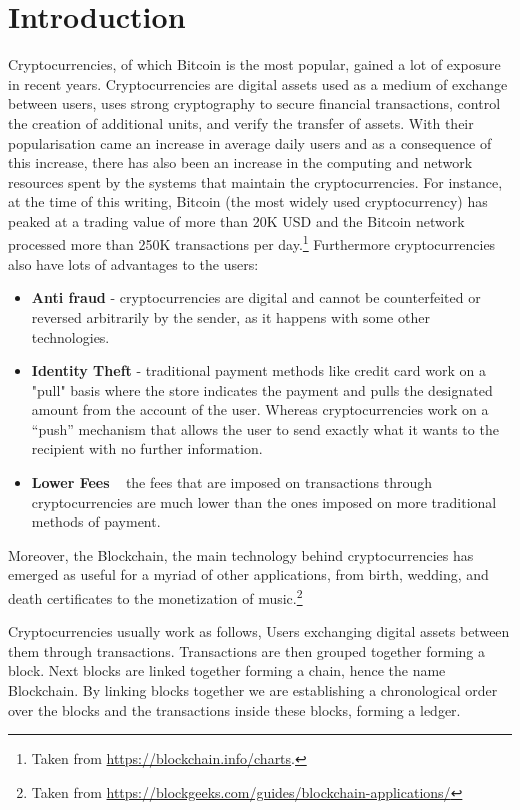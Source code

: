 \chapter{Introduction}
\label{chap:intro}
Cryptocurrencies, of which Bitcoin is the most popular, gained a lot of exposure in recent years. Cryptocurrencies are digital assets used as a medium of exchange between users, uses strong cryptography to secure financial transactions, control the creation of additional units, and verify the transfer of assets. With their popularisation came an increase in average daily users and as a consequence of this increase, there has also been an increase in the computing and network resources spent by the systems that maintain the cryptocurrencies. For instance, at the time of this writing, Bitcoin (the most widely used cryptocurrency) has peaked at a trading value of more than 20K USD and the Bitcoin network processed more than 250K transactions per day.\footnote{Taken from \url{https://blockchain.info/charts}.} Furthermore cryptocurrencies also have lots of advantages to the users:

\begin{itemize}
    \item \textbf{Anti fraud} - cryptocurrencies are digital and cannot be counterfeited or reversed arbitrarily by the sender, as it happens with some other technologies.
    \item \textbf{Identity Theft} - traditional payment methods like credit card work on a "pull" basis where the store indicates the payment and pulls the designated amount from the account of the user. Whereas cryptocurrencies work on a “push” mechanism that allows the user to send exactly what it wants to the recipient with no further information.
    \item \textbf{Lower Fees} ~ the fees that are imposed on transactions through cryptocurrencies are much lower than the ones imposed on more traditional methods of payment.
\end{itemize}

Moreover, the Blockchain, the main technology behind cryptocurrencies has emerged as useful for a myriad of other applications, from birth, wedding, and death certificates to the monetization of music.\footnote{Taken from \url{https://blockgeeks.com/guides/blockchain-applications/}}

Cryptocurrencies usually work as follows, Users exchanging digital assets between them through transactions. Transactions are then grouped together forming a block. Next blocks are linked together forming a chain, hence the name Blockchain. By linking blocks together we are establishing a chronological order over the blocks and the transactions inside these blocks, forming a ledger.

